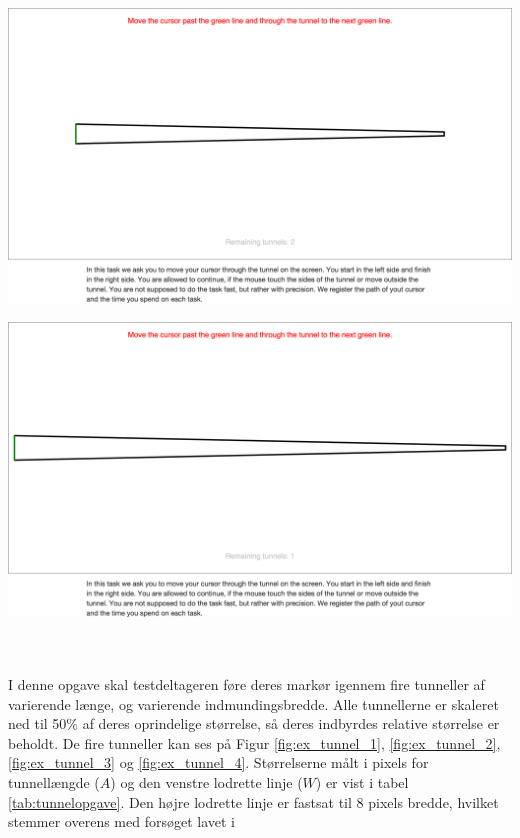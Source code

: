 \begin{minipage}{\linewidth}
\begin{minipage}{\textwidth}
		\includegraphics[width=\textwidth, trim = .5cm 20cm .5cm 15cm, clip]{images/screenshots/ex_step_4_tunnel_3}
		\label{fig:ex_tunnel_3}
	\end{minipage}
	\begin{minipage}{\textwidth}
		\centering
		\includegraphics[width=\textwidth, trim = .5cm 20cm .5cm 15cm, clip]{images/screenshots/ex_step_4_tunnel_4}
		\label{fig:ex_tunnel_4}
	\end{minipage}
\end{minipage}\\\\
I denne opgave skal testdeltageren føre deres markør igennem fire tunneller af varierende længe, og varierende indmundingsbredde. Alle tunnellerne er skaleret ned til 50\% af deres oprindelige størrelse, så deres indbyrdes relative størrelse er beholdt. De fire tunneller kan ses på Figur \ref{fig:ex_tunnel_1}, \ref{fig:ex_tunnel_2}, \ref{fig:ex_tunnel_3} og \ref{fig:ex_tunnel_4}.  Størrelserne målt i pixels for tunnellængde ($A$) og den venstre lodrette linje ($W$) er vist i tabel \ref{tab:tunnelopgave}. Den højre lodrette linje er fastsat til 8 pixels bredde, hvilket stemmer overens med forsøget lavet i \cite{accot1997}
